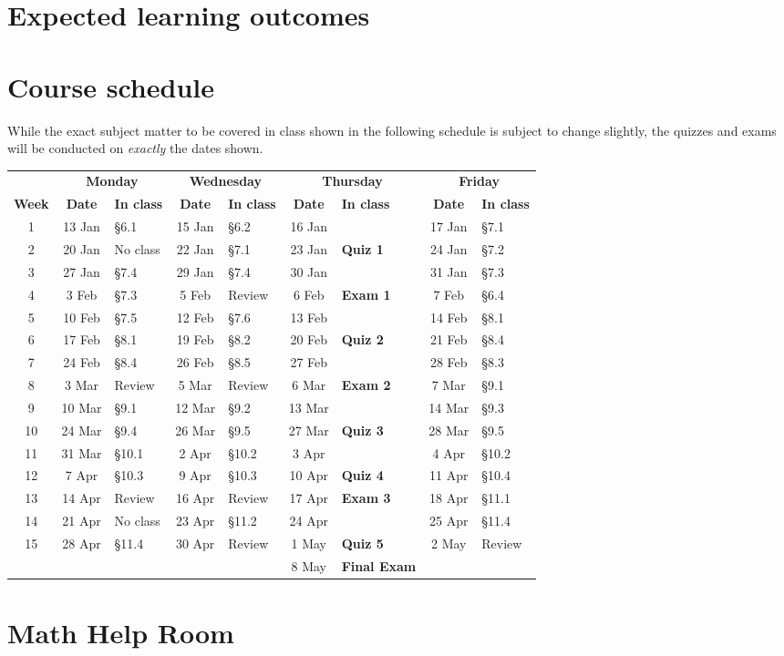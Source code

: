 \documentclass[11pt]{article}
\begin{document}
\section{Expected learning outcomes}
\section{Course schedule}\label{Schedule} While the exact subject
matter to be covered in class shown in the following schedule is
subject to change slightly, the quizzes and exams will be conducted
on {\em exactly} the dates shown.

\begin{tabular}{c|cl|cl|cl|cl}
&\multicolumn{2}{c|}{\bf Monday}
&\multicolumn{2}{c|}{\bf Wednesday}
&\multicolumn{2}{c|}{\bf Thursday}
&\multicolumn{2}{c}{\bf Friday}\\
{\bf Week}&{\bf Date}&{\bf In class}&{\bf Date}&{\bf In class}
&{\bf Date}&{\bf In class}&{\bf Date}&{\bf In class}\\\hline
1&13 Jan&\S6.1&15 Jan&\S6.2&16 Jan&&17 Jan&\S7.1\\
2&20 Jan&No class&22 Jan&\S7.1&23 Jan&{\bf Quiz 1}&24 Jan&\S7.2\\
3&27 Jan&\S7.4&29 Jan&\S7.4&30 Jan&&31 Jan&\S7.3\\
4&3 Feb&\S7.3&5 Feb&Review&6 Feb&{\bf Exam 1}&7 Feb&\S6.4\\
5&10 Feb&\S7.5&12 Feb&\S7.6&13 Feb&&14 Feb&\S8.1\\
6&17 Feb&\S8.1&19 Feb&\S8.2&20 Feb&{\bf Quiz 2}&21 Feb&\S8.4\\
7&24 Feb&\S8.4&26 Feb&\S8.5&27 Feb&&28 Feb&\S8.3\\
8&3 Mar&Review&5 Mar&Review&6 Mar&{\bf Exam 2}&7 Mar&\S9.1\\
9&10 Mar&\S9.1&12 Mar&\S9.2&13 Mar&&14 Mar&\S9.3\\
10&24 Mar&\S9.4&26 Mar&\S9.5&27 Mar&{\bf Quiz 3}&28 Mar&\S9.5\\
11&31 Mar&\S10.1&2 Apr&\S10.2&3 Apr&&4 Apr&\S10.2\\
12&7 Apr&\S10.3&9 Apr&\S10.3&10 Apr&{\bf Quiz 4}&11 Apr&\S10.4\\
13&14 Apr&Review&16 Apr&Review&17 Apr&{\bf Exam 3}&18 Apr&\S11.1\\
14&21 Apr&No class&23 Apr&\S11.2&24 Apr&&25 Apr&\S11.4\\
15&28 Apr&\S11.4&30 Apr&Review&1 May&{\bf Quiz 5}&2 May&Review\\
&&&&&8 May&{\bf Final Exam}
\end{tabular}

\section{Math Help Room}\label{MathCenter}
\end{document}

